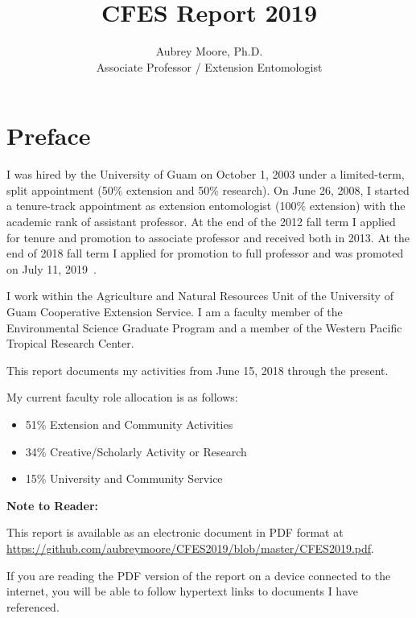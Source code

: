 \documentclass[12pt,english]{scrartcl}
\begin{document}
\title{CFES Report 2019}

\author{Aubrey Moore, Ph.D.\\
Associate Professor / Extension Entomologist}

\maketitle



\tableofcontents{}

\clearpage

\section{Preface}
\begin{refsection}
	
I was hired by the University of Guam on October 1, 2003 under a limited-term,
split appointment (50\% extension and 50\% research). On June 26,
2008, I started a tenure-track appointment as extension entomologist
(100\% extension) with the academic rank of assistant professor. At
the end of the 2012 fall term I applied for tenure and promotion to associate professor and
received both in 2013. At the end of 2018 fall term I applied for promotion to
full professor and was promoted on July 11, 2019~\cite{recommendation_for_promotion2019}. 

I work within the Agriculture and Natural Resources Unit of the University
of Guam Cooperative Extension Service. I am a faculty member of the
Environmental Science Graduate Program and a member of the Western
Pacific Tropical Research Center. 

This report documents my activities from June 15, 2018 through the present.

My current faculty role allocation is as follows:
\begin{itemize}
	\item 51\% Extension and Community Activities 
	\item 34\% Creative/Scholarly Activity or Research 
	\item 15\% University and Community Service
\end{itemize}

\textbf{Note to Reader:}

This report is available as an electronic document in PDF format at\\
\url{https://github.com/aubreymoore/CFES2019/blob/master/CFES2019.pdf}. 

If you are reading the PDF version of the report on a device connected
to the internet, you will be able to follow hypertext links to documents
I have referenced.

\printbibliography

\end{refsection} 
\end{document}
